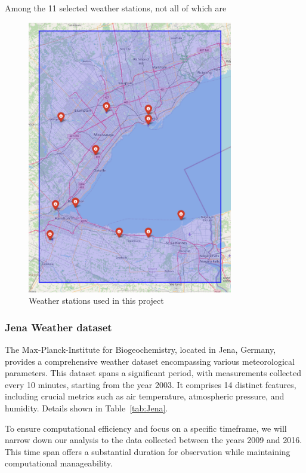\documentclass[12pt]{article}
\begin{document}
Among the 11 selected weather stations, not all of which are 

\begin{figure}[htpb]
	\centering
	\includegraphics[width=0.8\textwidth]{pic/stations.png}
	\caption{Weather stations used in this project}
	\label{Fig:stations}
\end{figure}

\subsubsection{Jena Weather dataset}

The Max-Planck-Institute for Biogeochemistry, located in Jena, Germany, provides a comprehensive weather dataset encompassing various meteorological parameters. This dataset spans a significant period, with measurements collected every 10 minutes, starting from the year 2003. It comprises 14 distinct features, including crucial metrics such as air temperature, atmospheric pressure, and humidity. Details shown in Table~\ref{tab:Jena}.

To ensure computational efficiency and focus on a specific timeframe, we will narrow down our analysis to the data collected between the years 2009 and 2016. This time span offers a substantial duration for observation while maintaining computational manageability.
\end{document}
